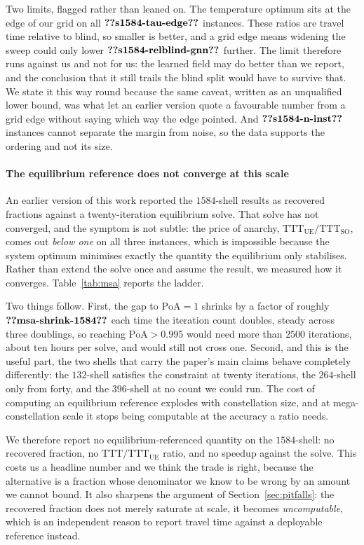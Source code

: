 \documentclass[journal]{IEEEtran}
\begin{document}
Two limits, flagged rather than leaned on. The temperature optimum sits at the edge of our grid
on all $\clm{s1584-tau-edge}$ instances. These ratios are travel time relative to blind, so
smaller is better, and a grid edge means widening the sweep could only lower
$\clm{s1584-relblind-gnn}$ further. The limit therefore runs against us and not for us: the
learned field may do better than we report, and the conclusion that it still trails the blind
split would have to survive that. We state it this way round because the same caveat, written
as an unqualified lower bound, was what let an earlier version quote a favourable number from a
grid edge without saying which way the edge pointed. And $\clm{s1584-n-inst}$ instances cannot
separate the margin from noise, so the data supports the ordering and not its size.

\paragraph{The equilibrium reference does not converge at this scale}
An earlier version of this work reported the $1584$-shell results as recovered fractions
against a twenty-iteration equilibrium solve. That solve has not converged, and the
symptom is not subtle: the price of anarchy, $\mathrm{TTT}_{\mathrm{UE}}/\mathrm{TTT}_{\mathrm{SO}}$,
comes out \emph{below one} on all three instances, which is impossible because the system
optimum minimises exactly the quantity the equilibrium only stabilises. Rather than extend
the solve once and assume the result, we measured how it converges. Table~\ref{tab:msa}
reports the ladder.




Two things follow. First, the gap to $\mathrm{PoA}=1$ shrinks by a factor of roughly
$\clm{msa-shrink-1584}$ each time the iteration count doubles, steady across three doublings, so reaching
$\mathrm{PoA}>0.995$ would need more than $2500$ iterations, about ten hours per solve,
and would still not cross one. Second, and this is the useful part, the two shells that
carry the paper's main claims behave completely differently: the $132$-shell satisfies the
constraint at twenty iterations, the $264$-shell only from forty, and the $396$-shell at no count we could run. The cost of computing an
equilibrium reference explodes with constellation size, and at mega-constellation scale it
stops being computable at the accuracy a ratio needs.

We therefore report no equilibrium-referenced quantity on the $1584$-shell: no recovered
fraction, no $\mathrm{TTT}/\mathrm{TTT}_{\mathrm{UE}}$ ratio, and no speedup against the
solve. This costs us a headline number and we think the trade is right, because the
alternative is a fraction whose denominator we know to be wrong by an amount we cannot
bound. It also sharpens the argument of Section~\ref{sec:pitfalls}: the recovered fraction
does not merely saturate at scale, it becomes \emph{uncomputable}, which is an independent
reason to report travel time against a deployable reference instead.
\end{document}
